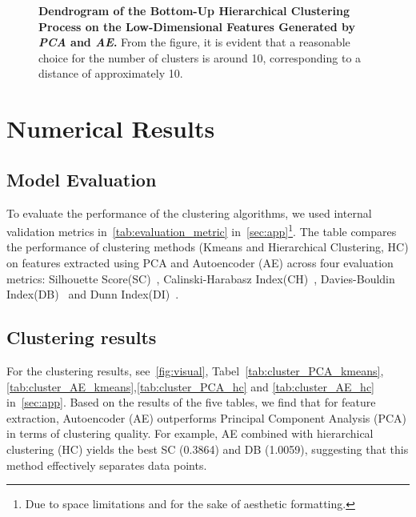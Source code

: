 \documentclass{article} %
\newcommand{\purpletext}[1]{\textcolor{purple!75!black}{#1}}
\begin{document}
\begin{figure}[!t]
\begin{subfigure}{.49\textwidth}
       \vspace{-5pt}
       \label{fig:dendrogram2}
   \end{subfigure}
   \caption{\textbf{Dendrogram of the Bottom-Up Hierarchical Clustering Process on the Low-Dimensional Features Generated by \textit{PCA} and \textit{AE}.} From the figure, it is evident that a reasonable choice for the number of clusters is around 10, corresponding to a distance of approximately 10.}
   \label{fig:dendrogram}
   \vspace{-12pt}
\end{figure}


\section{Numerical Results}
\label{sec:numerical}

\subsection{Model Evaluation}
To evaluate the performance of the clustering algorithms, we used internal validation metrics in~\autoref{tab:evaluation_metric} in~\autoref{sec:app}\footnote{Due to space limitations and for the sake of aesthetic formatting.}.
The table compares the performance of clustering methods (Kmeans and Hierarchical Clustering, HC) on features extracted using PCA and Autoencoder (AE) across four evaluation metrics: Silhouette Score(SC)~\citep{rousseeuw1987silhouettes}, Calinski-Harabasz Index(CH)~\citep{calinski1974dendrite}, Davies-Bouldin Index(DB)~\citep{davies1979cluster} and Dunn Index(DI)~\citep{dunn1974well}.



\subsection{Clustering results}
For the clustering results, see~\autoref{fig:visual}, Tabel~\ref{tab:cluster_PCA_kmeans},\ref{tab:cluster_AE_kmeans},\ref{tab:cluster_PCA_hc} and \ref{tab:cluster_AE_hc} in~\autoref{sec:app}.
Based on the results of the five tables, we find that \purpletext{for feature extraction, Autoencoder (AE) outperforms Principal Component Analysis (PCA) in terms of clustering quality}. 
For example, AE combined with hierarchical clustering (HC) yields the best SC (0.3864) and DB (1.0059), suggesting that this method effectively separates data points.
\end{document}
